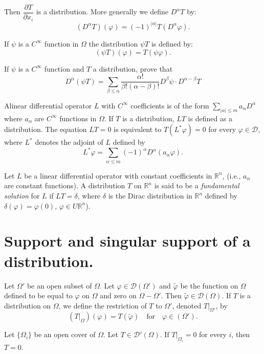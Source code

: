 Then $\dfrac{\partial T}{\partial x_{i}}$ is a distribution. More generally we define $D^{\alpha}T$ by:
$$
(D^{\alpha}T)(\varphi)=(-1)^{|\alpha|}T(D^{\alpha}\varphi).
$$

If $\psi$ is a $C^{\infty}$ function in $\Omega$ the distribution $\psi T$ is defined by:
$$
(\psi T)(\varphi)=T(\psi \varphi).
$$

\begin{exer*}
If $\psi$ is a $C^{\infty}$ function and $T$ a distribution, prove that
$$
D^{\alpha}(\psi T)=\sum\limits_{\beta\leq \alpha}\dfrac{\alpha!}{\beta!(\alpha-\beta)!}D^{\beta}\psi\cdot D^{\alpha-\beta}T
$$
\end{exer*}

A\pageoriginale linear differential operator $L$ with $C^{\infty}$ coefficients is of the form $\sum\limits_{|\alpha|\leq m}a_{\alpha}D^{\alpha}$ where $a_{\alpha}$ are $C^{\infty}$ functions in $\Omega$. If $T$ is a distribution, $LT$ is defined as a distribution. The equation $LT=0$ is equivalent to $T(L^{\ast}\varphi)=0$ for every $\varphi\in \mathcal{D}$, where $L^{\ast}$ denotes the adjoint of $L$ defined by
$$
L^{\ast}\varphi =\sum\limits_{\alpha \leq m}(-1)^{\alpha}D^{\alpha}(a_{\alpha}\varphi).
$$

Let $L$ be a linear differential operator with constant coefficients in $\mathbb{R}^{n}$, (i.e., $a_{\alpha}$ are constant functions). A distribution $T$ on $\mathbb{R}^{n}$ is said to be a {\em fundamental solution} for $L$ if $LT=\delta$, where $\delta$ is the Dirac distribution in $\mathbb{R}^{n}$ defined by $\delta(\varphi)=\varphi(0)$, $\varphi \in U\mathbb{R}^{n}$).

\section*{Support and singular support of a distribution.}

Let $\Omega'$ be an open subset of $\Omega$. Let $\varphi\in \mathcal{D}(\Omega')$ and $\widetilde{\varphi}$ be the function on $\Omega$ defined to be equal to $\varphi$ on $\Omega$ and zero on $\Omega-\Omega'$. Then $\widetilde{\varphi}\in \mathcal{D}(\Omega)$. If $T$ is a distribution on $\Omega$, we define the restriction of $T$ to $\Omega'$, denoted $T|_{\Omega'}$, by
$$
\left(T\big|_{\Omega}\right)(\varphi)=T(\widetilde{\varphi})\quad\text{for}\quad \varphi\in (\Omega').
$$

\begin{lemma}\label{chap3-lem5}
Let $\{\Omega_{i}\}$ be an open cover of $\Omega$. Let $T\in \mathcal{D}'(\Omega)$. If $T|_{\Omega_{i}}=0$ for every $i$, then $T=0$.
\end{lemma}


